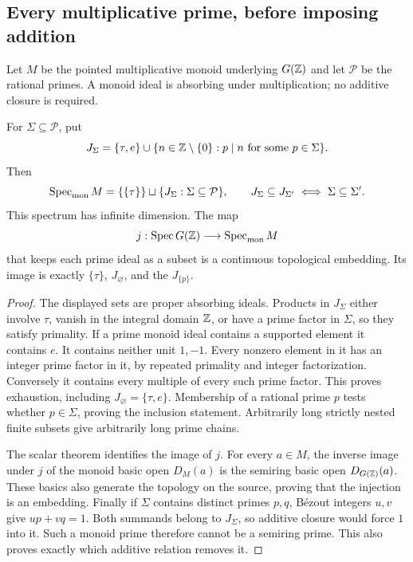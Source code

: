 \subsection{Every multiplicative prime, before imposing addition}
Let $M$ be the pointed multiplicative monoid underlying $G(\mathbb Z)$ and let $\mathcal P$ be the rational primes. A monoid ideal is absorbing under multiplication; no additive closure is required.
\begin{theorem}\label{thm:rebuilt-monoid}
For $\Sigma\subseteq\mathcal P$, put
\[
 J_\Sigma=\{\tau,e\}\cup\{n\in\mathbb Z\setminus\{0\}:p\mid n\text{ for some }p\in\Sigma\}.
\]
Then
\[
 \operatorname{Spec}_{\mathrm{mon}} M=\{\{\tau\}\}\sqcup\{J_\Sigma:\Sigma\subseteq\mathcal P\},
 \qquad J_\Sigma\subseteq J_{\Sigma'}\iff\Sigma\subseteq\Sigma'.
\]
This spectrum has infinite dimension. The map
\begin{equation}\label{eq:semiring-monoid-inclusion}
 j:\operatorname{Spec} G(\mathbb Z)\longrightarrow\operatorname{Spec}_{\mathrm{mon}} M
\end{equation}
that keeps each prime ideal as a subset is a continuous topological embedding. Its image is exactly $\{\tau\}$, $J_\varnothing$, and the $J_{\{p\}}$.
\end{theorem}
\begin{proof}
The displayed sets are proper absorbing ideals. Products in $J_\Sigma$ either involve $\tau$, vanish in the integral domain $\mathbb Z$, or have a prime factor in $\Sigma$, so they satisfy primality. If a prime monoid ideal contains a supported element it contains $e$. It contains neither unit $1,-1$. Every nonzero element in it has an integer prime factor in it, by repeated primality and integer factorization. Conversely it contains every multiple of every such prime factor. This proves exhaustion, including $J_\varnothing=\{\tau,e\}$. Membership of a rational prime $p$ tests whether $p\in\Sigma$, proving the inclusion statement. Arbitrarily long strictly nested finite subsets give arbitrarily long prime chains.

The scalar theorem identifies the image of $j$. For every $a\in M$, the inverse image under $j$ of the monoid basic open $D_M(a)$ is the semiring basic open $D_{G(\mathbb Z)}(a)$. These basics also generate the topology on the source, proving that the injection is an embedding. Finally if $\Sigma$ contains distinct primes $p,q$, B\'ezout integers $u,v$ give $up+vq=1$. Both summands belong to $J_\Sigma$, so additive closure would force $1$ into it. Such a monoid prime therefore cannot be a semiring prime. This also proves exactly which additive relation removes it.
\end{proof}

